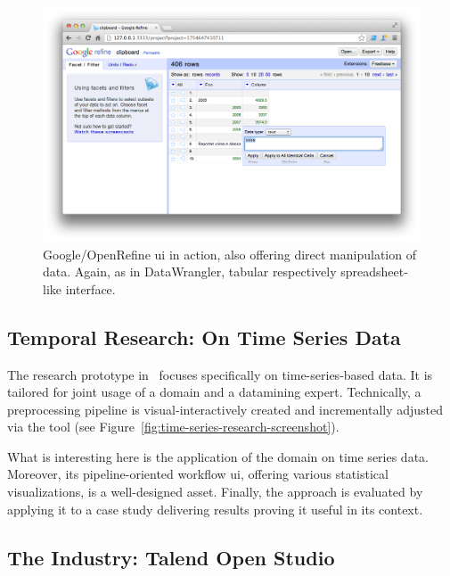 \begin{figure}[h]
  \centering
  \includegraphics[width=1.0\textwidth]{figures/state-of-the-art/google-refine}
  \caption{Google/OpenRefine \gls{ui} in action, also offering direct manipulation of data. Again, as in DataWrangler, tabular respectively spreadsheet-like interface.}
  \label{fig:open-refine-screenshot}
\end{figure}


\subsection{Temporal Research: On Time Series Data}

The research prototype in~\cite{Bernard2012} focuses specifically on time-series-based data.
It is tailored for joint usage of a domain and a \gls{datamining} expert.
Technically, a preprocessing pipeline is visual-interactively created and incrementally adjusted via the tool (see Figure~\ref{fig:time-series-research-screenshot}).

What is interesting here is the application of the domain on time series data.
Moreover, its pipeline-oriented workflow \gls{ui}, offering various statistical visualizations, is a well-designed asset.
Finally, the approach is evaluated by applying it to a case study delivering results proving it useful in its context.


\subsection{The Industry: Talend Open Studio}

